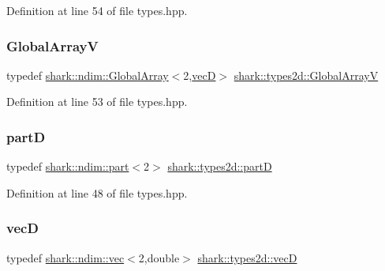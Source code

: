Definition at line 54 of file types.\+hpp.

\hypertarget{namespaceshark_1_1types2d_ae6263819e3d2ff5edf4c2c7621416a18}{}\label{namespaceshark_1_1types2d_ae6263819e3d2ff5edf4c2c7621416a18} 
\subsubsection{\texorpdfstring{Global\+ArrayV}{GlobalArrayV}}
{\footnotesize\ttfamily typedef \hyperlink{classshark_1_1ndim_1_1_global_array}{shark\+::ndim\+::\+Global\+Array}$<$2,\hyperlink{namespaceshark_1_1types2d_a738ed8ca791a1fce6898c99ca68afc45}{vecD}$>$ \hyperlink{namespaceshark_1_1types2d_ae6263819e3d2ff5edf4c2c7621416a18}{shark\+::types2d\+::\+Global\+ArrayV}}



Definition at line 53 of file types.\+hpp.

\hypertarget{namespaceshark_1_1types2d_a87ef5d69759f5e1abf90fa90d89ff15c}{}\label{namespaceshark_1_1types2d_a87ef5d69759f5e1abf90fa90d89ff15c} 
\subsubsection{\texorpdfstring{partD}{partD}}
{\footnotesize\ttfamily typedef \hyperlink{structshark_1_1ndim_1_1part}{shark\+::ndim\+::part}$<$2$>$ \hyperlink{namespaceshark_1_1types2d_a87ef5d69759f5e1abf90fa90d89ff15c}{shark\+::types2d\+::partD}}



Definition at line 48 of file types.\+hpp.

\hypertarget{namespaceshark_1_1types2d_a738ed8ca791a1fce6898c99ca68afc45}{}\label{namespaceshark_1_1types2d_a738ed8ca791a1fce6898c99ca68afc45} 
\subsubsection{\texorpdfstring{vecD}{vecD}}
{\footnotesize\ttfamily typedef \hyperlink{structshark_1_1ndim_1_1vec}{shark\+::ndim\+::vec}$<$2,double$>$ \hyperlink{namespaceshark_1_1types2d_a738ed8ca791a1fce6898c99ca68afc45}{shark\+::types2d\+::vecD}}




